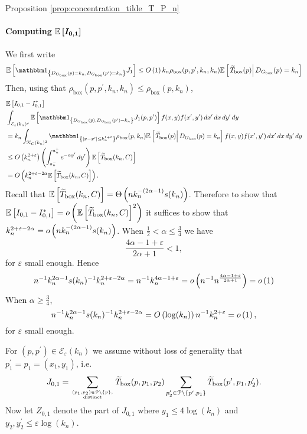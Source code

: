 \begin{proofof}{Proposition \ref{prop:concentration_tilde_T_P_n}}
\paragraph{Computing $\bm{\mathbb{E}\left[I_{0,1}\right]}$}

We first write
\begin{equation}\label{eq:bound_E_J1}
	\Exp{\ind{\Dbox(p) = k_n, \Dbox(p^\prime) = k_n} J_1}
	\le \bigO{1} k_n \rho_{\text{box}}(p,p^\prime,k_n,k_n)\CExp{\widetilde{T}_{\text{box}}(p)}{\Dbox(p) = k_n}
\end{equation}
Then, using that $\rho_{\text{box}}(p,p^\prime,k_n,k_n) \le \rho_{\text{box}}(p,k_n)$,
\begin{align*}
	&\Exp{I_{0,1} - I_{0,1}^\ast}\\
	&\int_{\mathcal{E}_\varepsilon(k_n)^c}
		\Exp{\ind{\Dbox(p), \Dbox(p^\prime) = k_n} J_1(p,p^\prime)} f(x,y) f(x^\prime,y^\prime) \, dx^\prime \, dx \, dy^\prime \, dy\\
	&= k_n \int_{\Kcal_C(k_n)^2} \ind{|x-x^\prime| \le k_n^{1 + \varepsilon}}
		\rho_{\text{box}}(p,k_n)\CExp{\widetilde{T}_{\text{box}}(p)}{\Dbox(p) = k_n} f(x,y) f(x^\prime,y^\prime) \, dx^\prime \, dx \, dy^\prime \, dy\\
	&\le \bigO{k_n^{2+\varepsilon}} \left(\int_{a_n^-}^{a_n^+} e^{-\alpha y^\prime} \, dy^\prime\right) 
		\Exp{\widetilde{T}_{\text{box}}(k_n,C)}\\
	&= \bigO{k_n^{2 + \varepsilon - 2\alpha} \Exp{\widetilde{T}_{\text{box}}(k_n,C)}}.
\end{align*}
Recall that $\mathbb{E}\left[\widetilde{T}_{\text{box}}(k_n,C)\right] = \Theta\left(n k_n^{-(2\alpha - 1)}s(k_n)\right)$. Therefore to show that $\mathbb{E}\left[I_{0,1} - I_{0,1}^\ast\right] = o\left(\mathbb{E}\left[\widetilde{T}_{\text{box}}(k_n,C)\right]^2\right)$ it suffices to show that $k_n^{2 + \varepsilon - 2\alpha} = o\left(n k_n^{-(2\alpha - 1)}s(k_n)\right)$. When $\frac{1}{2} < \alpha \le \frac{3}{4}$ we have
\[
	\frac{4\alpha - 1 + \varepsilon}{2\alpha + 1} < 1,
\]
for $\varepsilon$ small enough. Hence
\[
	n^{-1} k_n^{2\alpha - 1} s(k_n)^{-1} k_n^{2 + \varepsilon -2\alpha} = n^{-1} k_n^{4\alpha - 1 + \varepsilon} 
	= o\left(n^{-1}n^{\frac{4\alpha - 1 + \varepsilon}{2\alpha + 1}}\right) = o\left(1\right)
\]
When $\alpha \ge \frac{3}{4}$,
\[
	n^{-1} k_n^{2\alpha - 1} s(k_n)^{-1} k_n^{2 + \varepsilon -2\alpha} = O\left(\log(k_n)\right) n^{-1} k_n^{2 + \varepsilon} = o\left(1\right),
\]
for $\varepsilon$ small enough.

For $(p,p^\prime) \in \mathcal{E}_\varepsilon(k_n)$ we assume without loss of generality that $p_1^\prime = p_1 = (x_1,y_1)$, i.e.
\[
	J_{0,1} = \sum_{(p_1, p_2) \in {\mathcal P} \setminus \{p\},\atop \text{distinct}} \widetilde{T}_{\text{box}}(p,p_1,p_2) 
	\sum_{p_2^\prime \in {\mathcal P} \setminus \{p^\prime, p_1\}} \widetilde{T}_{\text{box}}(p^\prime,p_1,p_2^\prime). 
\] 
Now let $Z_{0,1}$ denote the part of $J_{0,1}$ where $y_1 \le 4\log(k_n)$ and $y_2, y_2^\prime \le \varepsilon \log(k_n)$. 


\end{proofof}
